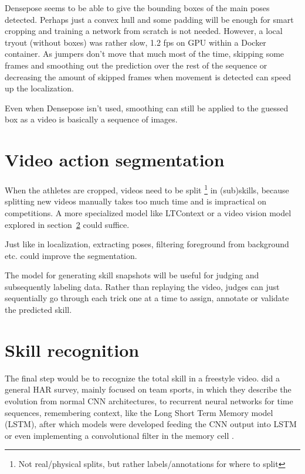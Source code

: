Densepose seems to be able to give the bounding boxes of the main poses detected. Perhaps just a convex hull and some padding will be enough for smart cropping and training a network from scratch is not needed.
However, a local tryout (without boxes) was rather slow, 1.2 fps on GPU within a Docker container.
As jumpers don't move that much most of the time, skipping some frames and smoothing out the prediction over the rest of the sequence or decreasing the amount of skipped frames when movement is detected can speed up the localization.

Even when Densepose isn't used, smoothing can still be applied to the guessed box as a video is basically a sequence of images.


\section{Video action segmentation}

When the athletes are cropped, videos need to be split \footnote{Not real/physical splits, but rather labels/annotations for where to split} in (sub)skills, because splitting new videos manually takes too much time and is impractical on competitions. A more specialized model like LTContext \autocite{Jiaming_2023} or a video vision model explored in section~\ref{subsec:bp-skill-recognition} could suffice.

Just like in localization, extracting poses, filtering foreground from background etc. could improve the segmentation.

The model for generating skill snapshots will
be useful for judging and subsequently labeling
data. Rather than replaying the video, judges can
just sequentially go through each trick one at a
time to assign, annotate or validate the predicted
skill.




\section{Skill recognition}
\label{subsec:bp-skill-recognition}

The final step would be to recognize the total skill in a freestyle video.
\textcite{Yin_2024} did a general HAR survey, mainly focused on team sports, in which they describe the evolution from normal CNN architectures, to recurrent neural networks for time sequences, remembering context, like the Long Short Term Memory model (LSTM), after which models were developed feeding the CNN output into LSTM or even implementing a convolutional filter in the memory cell \autocite{Shi_2015}.

